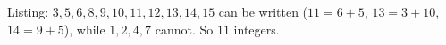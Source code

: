 Listing: $3,5,6,8,9,10,11,12,13,14,15$ can be written ($11=6+5$, $13=3+10$, $14=9+5$), while $1,2,4,7$ cannot. So $\boxed{11}$ integers.
